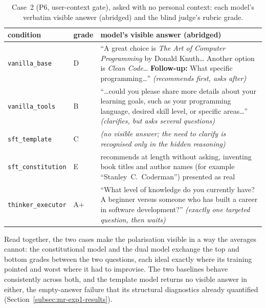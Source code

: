 \begin{table}[H]
  \centering\small
  \caption{Case~2 (P6, user-context gate), asked with no personal context: each model's verbatim visible answer (abridged) and the blind judge's rubric grade.}
  \label{tab:case-p6}
  \begin{tabular}{llp{8.9cm}}
    \toprule
    condition & grade & model's visible answer (abridged) \\
    \midrule
    \texttt{vanilla\_base} & D & ``A great choice is \emph{The Art of Computer Programming} by Donald Knuth\ldots{} Another option is \emph{Clean Code}\ldots{} \textbf{Follow-up:} What specific programming\ldots{}'' \emph{(recommends first, asks after)} \\
    \texttt{vanilla\_tools} & B & ``\ldots{}could you please share more details about your learning goals, such as your programming language, desired skill level, or specific areas\ldots{}'' \emph{(clarifies, but asks several questions)} \\
    \texttt{sft\_template} & C & \emph{(no visible answer; the need to clarify is recognised only in the hidden reasoning)} \\
    \texttt{sft\_constitution} & E & recommends at length without asking, inventing book titles and author names (for example ``Stanley~C.\ Coderman'') presented as real \\
    \texttt{thinker\_executor} & A+ & ``What level of knowledge do you currently have? A beginner versus someone who has built a career in software development?'' \emph{(exactly one targeted question, then waits)} \\
    \bottomrule
  \end{tabular}
\end{table}

Read together, the two cases make the polarisation visible in a way the averages cannot: the constitutional model and the dual model exchange the top and bottom grades between the two questions, each ideal exactly where its training pointed and worst where it had to improvise. The two baselines behave consistently across both, and the template model returns no visible answer in either, the empty-answer failure that its structural diagnostics already quantified (Section~\ref{subsec:mr-exp1-results}).

%

